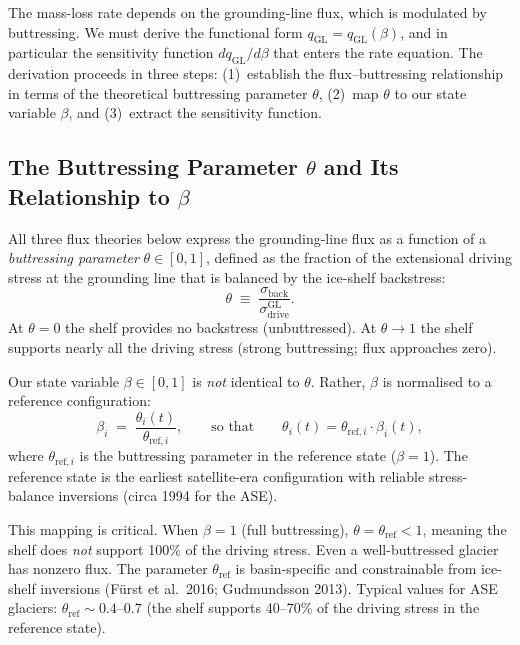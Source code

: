 \documentclass[11pt]{article}
\theoremstyle{definition}
\begin{document}
The mass-loss rate depends on the grounding-line flux, which is modulated by buttressing.  We must derive the functional form $q_\text{GL} = q_\text{GL}(\beta)$, and in particular the sensitivity function $dq_\text{GL}/d\beta$ that enters the rate equation.  The derivation proceeds in three steps: (1)~establish the flux--buttressing relationship in terms of the theoretical buttressing parameter $\theta$, (2)~map $\theta$ to our state variable $\beta$, and (3)~extract the sensitivity function.

\subsection{The Buttressing Parameter $\theta$ and Its Relationship to $\beta$}
\label{sec:theta_beta}

All three flux theories below express the grounding-line flux as a function of a \emph{buttressing parameter} $\theta \in [0, 1]$, defined as the fraction of the extensional driving stress at the grounding line that is balanced by the ice-shelf backstress:
\begin{equation}
  \theta \;\equiv\; \frac{\sigma_{\text{back}}}{\sigma_{\text{drive}}^{\text{GL}}}.
  \label{eq:theta_def}
\end{equation}
At $\theta = 0$ the shelf provides no backstress (unbuttressed).  At $\theta \to 1$ the shelf supports nearly all the driving stress (strong buttressing; flux approaches zero).

Our state variable $\beta \in [0,1]$ is \emph{not} identical to $\theta$.  Rather, $\beta$ is normalised to a reference configuration:
\begin{equation}
  \beta_i \;=\; \frac{\theta_i(t)}{\theta_{\text{ref},i}}, \qquad \text{so that} \qquad \theta_i(t) = \theta_{\text{ref},i} \cdot \beta_i(t),
  \label{eq:beta_theta_map}
\end{equation}
where $\theta_{\text{ref},i}$ is the buttressing parameter in the reference state ($\beta = 1$).  The reference state is the earliest satellite-era configuration with reliable stress-balance inversions (circa 1994 for the ASE).

This mapping is critical.  When $\beta = 1$ (full buttressing), $\theta = \theta_{\text{ref}} < 1$, meaning the shelf does \emph{not} support 100\% of the driving stress.  Even a well-buttressed glacier has nonzero flux.  The parameter $\theta_{\text{ref}}$ is basin-specific and constrainable from ice-shelf inversions (F\"{u}rst et al.\ 2016; Gudmundsson 2013).  Typical values for ASE glaciers: $\theta_{\text{ref}} \sim 0.4$--$0.7$ (the shelf supports 40--70\% of the driving stress in the reference state).
\end{document}
